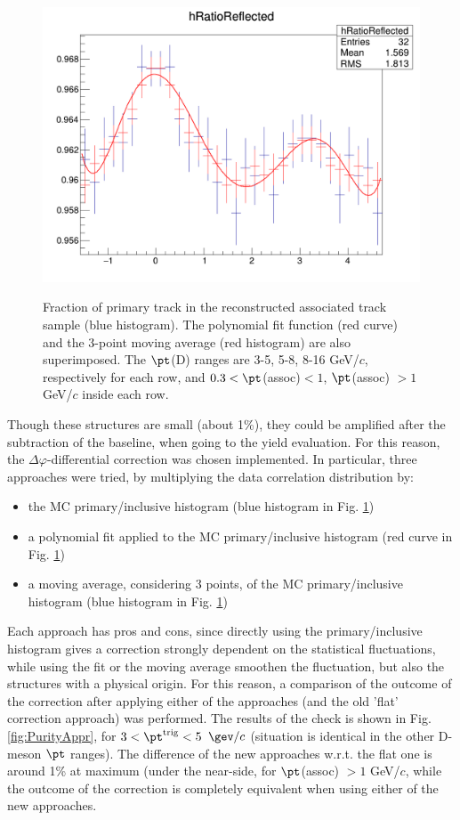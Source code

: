 \begin{figure}
{\includegraphics[width=0.4\linewidth]{figuresVsCent/Global/Purity/DeltaPhi_8to16_1to99_RatioPrimOverAll.png}}
 \caption{Fraction of primary track in the reconstructed associated track sample (blue histogram). The polynomial fit function (red curve) and the 3-point moving average (red histogram) are also superimposed. The $\pt$(D) ranges are 3-5, 5-8, 8-16 GeV/$c$, respectively for each row, and $0.3 < \pt$(assoc)$ < 1$, $\pt$(assoc) $> 1$ GeV/$c$ inside each row. }
\label{fig:Purity}
\end{figure}

Though these structures are small (about 1\%), they could be amplified after the subtraction of the baseline, when going to the yield evaluation. For this reason, the $\Delta\varphi$-differential correction was chosen implemented.
In particular, three approaches were tried, by multiplying the data correlation distribution by:
\begin{itemize}
  \item the MC primary/inclusive histogram (blue histogram in Fig. \ref{fig:Purity})
  \item a polynomial fit applied to the MC primary/inclusive histogram (red curve in Fig. \ref{fig:Purity})
  \item a moving average, considering 3 points, of the MC primary/inclusive histogram (blue histogram in Fig. \ref{fig:Purity})
\end{itemize}
Each approach has pros and cons, since directly using the primary/inclusive histogram gives a correction strongly dependent on the statistical fluctuations, while using the fit or the moving average smoothen the fluctuation, but also the structures with a physical origin.
For this reason, a comparison of the outcome of the correction after applying either of the approaches (and the old 'flat' correction approach) was performed.
The results of the check is shown in Fig. \ref{fig:PurityAppr}, for $3<\pt^{\rm trig}<5$ $\gev/c$ (situation is identical in the other D-meson $\pt$ ranges). The difference of the new approaches w.r.t. the flat one is around 1\% at maximum (under the near-side, for $\pt$(assoc) $> 1$ GeV/$c$, while the outcome of the correction is completely equivalent when using either of the new approaches.

